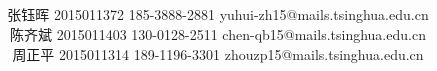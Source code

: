 

\title{ \\  \\}
\date{}
\author{张钰晖 2015011372 185-3888-2881 yuhui-zh15@mails.tsinghua.edu.cn\\
陈齐斌 2015011403 130-0128-2511 chen-qb15@mails.tsinghua.edu.cn\\
周正平 2015011314 189-1196-3301 zhouzp15@mails.tsinghua.edu.cn}

\maketitle
\clearpage
\tableofcontents
\graphicspath{ {images/} }






















